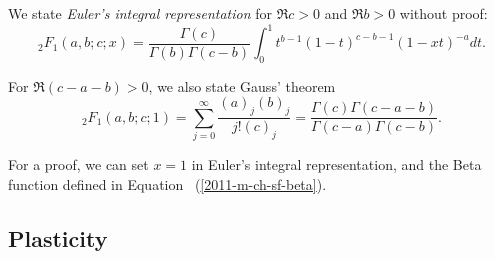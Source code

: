 We state {\em Euler's integral representation} for $\Re c>0$ and $\Re b>0$  without proof:
\begin{equation}
 {\;}_2F_1(a,b;c;x)=\frac{\Gamma(c)}{\Gamma(b)\Gamma(c-b)}
\int_0^1 t^{b-1}(1-t)^{c-b-1}(1-xt)^{-a} dt
.
\end{equation}


For  $\Re (c-a-b)>0$, we also state Gauss' theorem
\begin{equation}
 {\;}_2F_1(a,b;c;1)=\sum_{j=0}^\infty \frac{(a)_j(b)_j}{j! (c)_j} =\frac{\Gamma(c)\Gamma(c-a-b)}{\Gamma(c-a)\Gamma(c-b)}.
\end{equation}

{\color{OliveGreen}
\bproof
For a proof, we can set $x=1$ in Euler's integral representation, and the Beta function defined in Equation~
(\ref{2011-m-ch-sf-beta}).
\eproof
}

\subsection{Plasticity}

